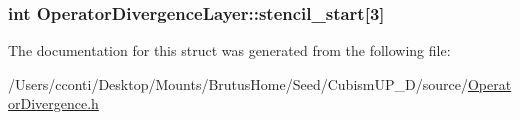 \subsubsection[{stencil\+\_\+start}]{\setlength{\rightskip}{0pt plus 5cm}int Operator\+Divergence\+Layer\+::stencil\+\_\+start\mbox{[}3\mbox{]}}\label{struct_operator_divergence_layer_adece33a63a9dea1acea07d718d60a9cc}


The documentation for this struct was generated from the following file\+:\begin{DoxyCompactItemize}
\item 
/\+Users/cconti/\+Desktop/\+Mounts/\+Brutus\+Home/\+Seed/\+Cubism\+U\+P\+\_\+D/source/\hyperlink{_operator_divergence_8h}{Operator\+Divergence.\+h}\end{DoxyCompactItemize}
